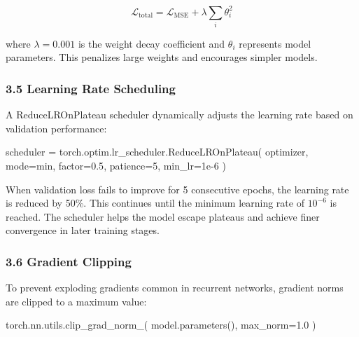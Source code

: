 \documentclass[
]{article}
\newenvironment{Shaded}{}{}
\newcommand{\DecValTok}[1]{\textcolor[rgb]{0.25,0.63,0.44}{#1}}
\newcommand{\FloatTok}[1]{\textcolor[rgb]{0.25,0.63,0.44}{#1}}
\newcommand{\NormalTok}[1]{#1}
\newcommand{\OperatorTok}[1]{\textcolor[rgb]{0.40,0.40,0.40}{#1}}
\newcommand{\StringTok}[1]{\textcolor[rgb]{0.25,0.44,0.63}{#1}}
\begin{document}
\[\mathcal{L}_{\text{total}} = \mathcal{L}_{\text{MSE}} + \lambda \sum_{i} \theta_i^2\]

where $\lambda = 0.001$ is the weight decay coefficient and $\theta_i$ represents model parameters. This penalizes large weights and encourages simpler models.

\subsubsection{3.5 Learning Rate
Scheduling}\label{35-learning-rate-scheduling}

A ReduceLROnPlateau scheduler dynamically adjusts the learning rate
based on validation performance:

\begin{Shaded}
\begin{Highlighting}[]
\NormalTok{scheduler }\OperatorTok{=}\NormalTok{ torch.optim.lr\_scheduler.ReduceLROnPlateau(}
\NormalTok{    optimizer,}
\NormalTok{    mode}\OperatorTok{=}\StringTok{\textquotesingle{}min\textquotesingle{}}\NormalTok{,}
\NormalTok{    factor}\OperatorTok{=}\FloatTok{0.5}\NormalTok{,}
\NormalTok{    patience}\OperatorTok{=}\DecValTok{5}\NormalTok{,}
\NormalTok{    min\_lr}\OperatorTok{=}\FloatTok{1e{-}6}
\NormalTok{)}
\end{Highlighting}
\end{Shaded}

When validation loss fails to improve for 5 consecutive epochs, the
learning rate is reduced by 50\%. This continues until the minimum
learning rate of $10^{-6}$ is reached. The scheduler helps the model escape
plateaus and achieve finer convergence in later training stages.

\subsubsection{3.6 Gradient Clipping}\label{36-gradient-clipping}

To prevent exploding gradients common in recurrent networks, gradient
norms are clipped to a maximum value:

\begin{Shaded}
\begin{Highlighting}[]
\NormalTok{torch.nn.utils.clip\_grad\_norm\_(}
\NormalTok{    model.parameters(),}
\NormalTok{    max\_norm}\OperatorTok{=}\FloatTok{1.0}
\NormalTok{)}
\end{Highlighting}
\end{Shaded}
\end{document}
